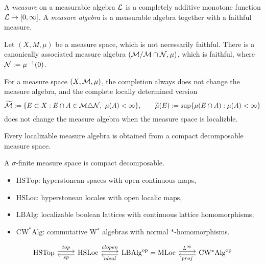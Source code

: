 \documentclass{../../large}
\begin{document}
\begin{prb}
A \emph{measure} on a measurable algebra $\mathcal{L}$ is a completely additive monotone function $\mathcal{L}\to[0,\infty]$.
A \emph{measure algebra} is a measurable algebra together with a faithful measure.

Let $(X,M,\mu)$ be a measure space, which is not necessarily faithful.
There is a canonically associated measure algebra $(\mathcal{M}/\mathcal{M}\cap\mathcal{N},\mu)$, which is faithful, where $\mathcal{N}:=\mu^{-1}(0)$.

\end{prb}


\begin{prb}

For a measure space $(X,\mathcal{M},\mu)$, the completion always does not change the measure algebra, and the complete locally determined version
\[\tilde\cM:=\{E\subset X:E\cap A\in\cM\triangle\cN,\ \mu(A)<\infty\},\qquad\tilde\mu(E):=\sup\{\mu(E\cap A):\mu(A)<\infty\}\]
does not change the measure algebra when the measure space is localizble.


\begin{parts}
\item Every localizable measure algebra is obtained from a compact decomposable measure space.
\item A $\sigma$-finite measure space is compact decomposable.
\end{parts}
\end{prb}









\begin{itemize}
\item $\mathrm{HSTop}$: hyperstonean spaces with open continuous maps,
\item $\mathrm{HSLoc}$: hyperstonean locales with open localic maps,
\item $\mathrm{LBAlg}$: localizable boolean lattices with continuous lattice homomorphisms,
\item $\mathrm{CW^*Alg}$: commutative W$^*$ algebras with normal $*$-homomorphisms.
\end{itemize}

\[\begin{tikzcd}
\mathrm{HSTop} \rar[shift left]{top}&
\mathrm{HSLoc} \lar[shift left]{sp}\rar[shift left]{clopen}&
\mathrm{LBAlg}^\op=\mathrm{MLoc} \lar[shift left]{ideal}\rar[shift left]{L^\infty}&
\mathrm{CW^*Alg}^\op \lar[shift left]{proj}
\end{tikzcd}\]
\end{document}
